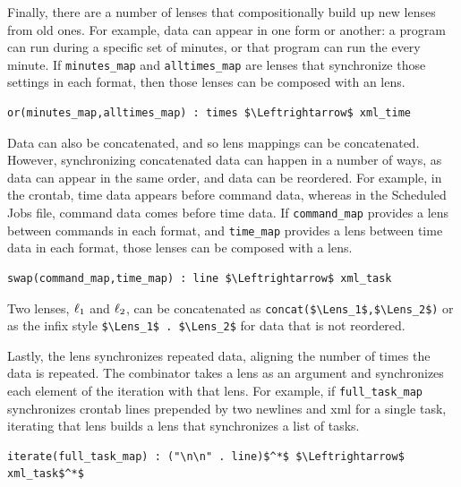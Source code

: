 \documentclass[acmsmall,screen,anonymous]{acmart}
\begin{document}
Finally, there are a number of lenses that compositionally build up new lenses
from old ones. For example, data can appear in one form or another: a program
can run during a specific set of minutes, or that program can run the every
minute. If \lstinline{minutes_map} and \lstinline{alltimes_map} are lenses that
synchronize those settings in each format, then those lenses can be composed
with an \OrLens lens.
%
\begin{lstlisting}
or(minutes_map,alltimes_map) : times $\Leftrightarrow$ xml_time
\end{lstlisting}

Data can also be concatenated, and so lens mappings can be concatenated.
However, synchronizing concatenated data can happen in a number of ways, as data
can appear in the same order, and data can be reordered. For example, in the
crontab, time data appears before command data, whereas in the Scheduled Jobs
file, command data comes before time data. If \lstinline{command_map} provides a
lens between commands in each format, and \lstinline{time_map} provides a lens
between time data in each format, those lenses can be composed with a \SwapLens
lens.
%
\begin{lstlisting}
swap(command_map,time_map) : line $\Leftrightarrow$ xml_task
\end{lstlisting}
%
Two lenses, $\mathit{\ell}_1$ and $\mathit{\ell}_2$, can be concatenated as
\lstinline{concat($\Lens_1$,$\Lens_2$)} or as the infix style
\lstinline{$\Lens_1$ . $\Lens_2$} for data that is not reordered.

Lastly, the \IterateLens lens synchronizes repeated data, aligning the number of
times the data is repeated. The \IterateLens combinator takes a lens as an
argument and synchronizes each element of the iteration with that lens. For
example, if \lstinline{full_task_map} synchronizes crontab lines prepended by
two newlines and xml for a single task, iterating that lens builds a lens that
synchronizes a list of tasks.
%
\begin{lstlisting}
iterate(full_task_map) : ("\n\n" . line)$^*$ $\Leftrightarrow$ xml_task$^*$
\end{lstlisting}
%
\end{document}
